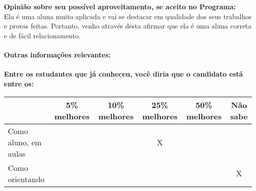 \documentclass[11pt]{article}
\begin{document}
\\
\\
\textbf{Opinião sobre seu possível aproveitamento, se aceito no Programa:}
\\Ela é uma aluna muito aplicada e vai se destacar em
qualidade dos seus trabalhos e provas feitas. Portanto, venho 
através desta afirmar que ela é uma aluna correta e de fácil relacionamento.\\ 
\\
\textbf{Outras informações relevantes:} \\
\\[0.3cm]
\textbf{Entre os estudantes que já conheceu, você diria que o candidato está entre os:}
\\
\begin{tabular}{|l|c|c|c|c|c|}
\hline
 & 5\% melhores & 10\% melhores & 25\% melhores & 50\% melhores & Não sabe \\
\hline
Como aluno, em aulas &  &  & X &  & \\
\hline
Como orientando &  &  &  &  & X\\
\hline
\end{tabular}
\end{document}
